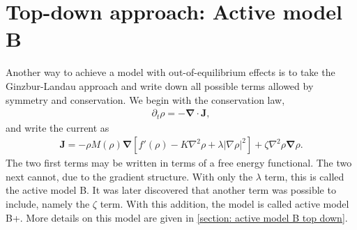 \section{Top-down approach: Active model B}

Another way to achieve a model with out-of-equilibrium effects is to take the Ginzbur-Landau approach and write down all possible terms allowed by symmetry and conservation.
We begin with the conservation law,
%
\begin{align}
    \partial_t \rho = - \bm \nabla \cdot \bm J,
\end{align}
%
and write the current as
%
\begin{align}
    \bm J = 
    - \rho M(\rho) \bm \nabla 
    \left[
        f'(\rho) - K \nabla^2 \rho + \lambda |\nabla \rho|^2
    \right]
    + \zeta \nabla^2 \rho \bm \nabla \rho.
\end{align}
%
The two first terms may be written in terms of a free energy functional.
The two next cannot, due to the gradient structure.
With only the $\lambda$ term, this is called the active model B.
It was later discovered that another term was possible to include, namely the $\zeta$ term.
With this addition, the model is called active model B+.
More details on this model are given in \autoref{section: active model B top down}.





